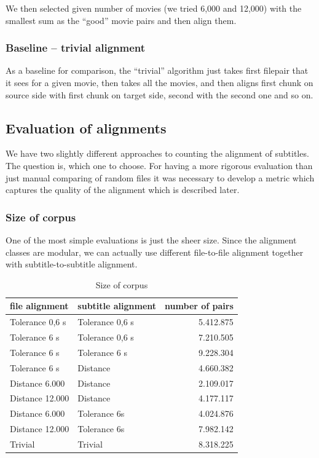 We then selected given number of movies (we tried 6,000 and 12,000) with the smallest sum as the ``good'' movie pairs and then align them.

\subsubsection{Baseline -- trivial alignment}
As a baseline for comparison, the ``trivial'' algorithm just takes first filepair that it sees for a given movie, then takes all the movies, and then aligns first chunk on source side with first chunk on target side, second with the second one and so on.

\subsection{Evaluation of alignments}
We have two slightly different approaches to counting the alignment of subtitles. The question is, which one to choose. For having a more rigorous evaluation than just manual comparing of random files it was necessary to develop a metric which captures the quality of the alignment which is described later.

\subsubsection{Size of corpus}
One of the most simple evaluations is just the sheer size. Since the alignment classes are modular, we can actually use different file-to-file alignment together with subtitle-to-subtitle alignment.

\begin{table}[h]
\begin{center}
\begin{tabular}{|l|l|r|}
    \hline
    \textbf{file alignment} & \textbf{subtitle alignment} & \textbf{number of pairs} \\ \hline
    Tolerance 0,6 s & Tolerance 0,6 s & 5.412.875 \\ \hline
    Tolerance 6 s & Tolerance 0,6 s & 7.210.505 \\  \hline
    Tolerance 6 s & Tolerance 6 s & 9.228.304 \\ \hline
    Tolerance 6 s & Distance & 4.660.382 \\ \hline
    Distance 6.000 & Distance & 2.109.017 \\ \hline
    Distance 12.000 & Distance & 4.177.117 \\ \hline
    Distance 6.000 & Tolerance 6s & 4.024.876 \\ \hline
    Distance 12.000 & Tolerance 6s & 7.982.142 \\ \hline
    Trivial & Trivial & 8.318.225 \\ \hline
    
\end{tabular}
\end{center}

\caption{Size of corpus}\label{corpusize}
\end{table}

